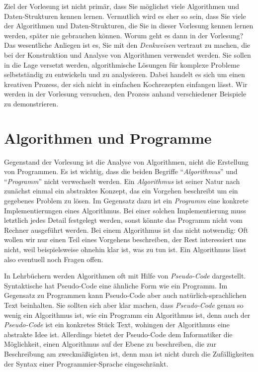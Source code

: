 Ziel der Vorlesung ist nicht prim\"ar, dass Sie m\"oglichst viele Algorithmen und
Daten-Strukturen kennen lernen.  Vermutlich wird es eher so sein, dass Sie viele der
Algorithmen und Daten-Strukturen, die Sie in dieser Vorlesung kennen lernen
werden, sp\"ater nie gebrauchen k\"onnen.  
Worum geht es dann in der Vorlesung?  Das wesentliche Anliegen 
ist es, Sie mit den \emph{Denkweisen} vertraut zu machen, die bei der
Konstruktion und Analyse von Algorithmen verwendet werden.  Sie sollen in die
Lage versetzt werden, algorithmische L\"osungen f\"ur komplexe Probleme
selbstst\"andig zu entwickeln und zu analysieren.  Dabei handelt es sich um einen
 kreativen Prozess, der sich nicht in einfachen Kochrezepten
einfangen l\"asst.  
Wir werden in der Vorlesung versuchen, den Prozess anhand verschiedener
Beispiele zu demonstrieren.  

\section{Algorithmen und Programme}
Gegenstand der Vorlesung ist die Analyse von Algorithmen, nicht die Erstellung von Programmen.  Es
ist wichtig, dass die beiden Begriffe ``\emph{Algorithmus}'' und ``\emph{Programm}'' nicht
verwechselt werden.  Ein \emph{Algorithmus} ist seiner Natur nach zun\"achst einmal ein abstraktes
Konzept, das ein Vorgehen beschreibt um ein gegebenes Problem zu l\"osen.  Im Gegensatz dazu ist ein
\emph{Programm} eine konkrete Implementierungen eines Algorithmus.  Bei einer solchen
Implementierung muss letztlich jedes Detail festgelegt werden, sonst k\"onnte das Programm nicht vom
Rechner ausgef\"uhrt werden.  Bei einem Algorithmus ist das nicht notwendig: Oft wollen wir nur einen
Teil eines Vorgehens beschreiben, der Rest interessiert uns nicht, weil beispielsweise ohnehin klar
ist, was zu tun ist.  Ein Algorithmus l\"asst also eventuell noch Fragen offen.

In Lehrb\"uchern werden Algorithmen oft mit Hilfe von \emph{Pseudo-Code} dargestellt.  Syntaktische
hat Pseudo-Code eine \"ahnliche Form wie ein Programm.  Im Gegensatz zu Programmen kann Pseudo-Code
aber auch nat\"urlich-sprachlichen Text beinhalten. Sie sollten sich aber klar machen, dass
\emph{Pseudo-Code} genau so wenig ein Algorithmus ist, wie ein Programm ein Algorithmus ist, denn
auch der \emph{Pseudo-Code} ist ein konkretes St\"uck Text, wohingen der Algorithmus eine abstrakte
Idee ist.  Allerdings bietet der Pseudo-Code dem Informatiker die M\"oglichkeit, einen Algorithmus auf
der Ebene zu beschreiben, die zur Beschreibung am zweckm\"a{\ss}igisten ist, denn man ist nicht durch die
Zuf\"alligkeiten der Syntax einer Programmier-Sprache eingeschr\"ankt.

